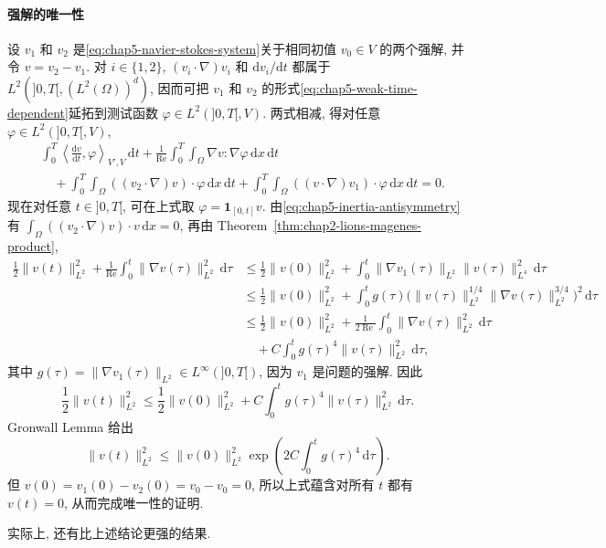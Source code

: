 \paragraph{强解的唯一性}
\label{subsec:chap5-strong-uniqueness}

设 $v_1$ 和 $v_2$ 是\eqref{eq:chap5-navier-stokes-system}关于相同初值 $v_0\in V$ 的两个强解, 并令 $v=v_2-v_1$. 对 $i\in\{1,2\}$, $(v_i\cdot\nabla)v_i$ 和 $\mathrm dv_i/\mathrm dt$ 都属于 $L^2(]0,T[,(L^2(\Omega))^d)$, 因而可把 $v_1$ 和 $v_2$ 的形式\eqref{eq:chap5-weak-time-dependent}延拓到测试函数 $\varphi\in L^2(]0,T[,V)$. 两式相减, 得对任意 $\varphi\in L^2(]0,T[,V)$,
\begin{align*}
 &\int_0^T\left\langle\frac{\mathrm dv}{\mathrm dt},\varphi\right\rangle_{V',V}\,\mathrm dt
 +\frac1{\operatorname{Re}}\int_0^T\int_\Omega\nabla v:\nabla\varphi\,\mathrm dx\,\mathrm dt\\
 &\quad+\int_0^T\int_\Omega((v_2\cdot\nabla)v)\cdot\varphi\,\mathrm dx\,\mathrm dt
 +\int_0^T\int_\Omega((v\cdot\nabla)v_1)\cdot\varphi\,\mathrm dx\,\mathrm dt=0.
\end{align*}
现在对任意 $t\in]0,T[$, 可在上式取 $\varphi=\mathbf1_{[0,t]}v$. 由\eqref{eq:chap5-inertia-antisymmetry}有 $\int_\Omega((v_2\cdot\nabla)v)\cdot v\,\mathrm dx=0$, 再由 Theorem~\ref{thm:chap2-lions-magenes-product},
\begin{align*}
 \frac12\|v(t)\|_{L^2}^2
 +\frac1{\operatorname{Re}}\int_0^t\|\nabla v(\tau)\|_{L^2}^2\,\mathrm d\tau
 &\leq\frac12\|v(0)\|_{L^2}^2
 +\int_0^t\|\nabla v_1(\tau)\|_{L^2}\|v(\tau)\|_{L^4}^2\,\mathrm d\tau\\
 &\leq\frac12\|v(0)\|_{L^2}^2
 +\int_0^tg(\tau)\bigl(\|v(\tau)\|_{L^2}^{1/4}
 \|\nabla v(\tau)\|_{L^2}^{3/4}\bigr)^2\,\mathrm d\tau\\
 &\leq\frac12\|v(0)\|_{L^2}^2
 +\frac1{2\operatorname{Re}}\int_0^t\|\nabla v(\tau)\|_{L^2}^2\,\mathrm d\tau\\
 &\quad+C\int_0^tg(\tau)^4\|v(\tau)\|_{L^2}^2\,\mathrm d\tau,
\end{align*}
其中 $g(\tau)=\|\nabla v_1(\tau)\|_{L^2}\in L^\infty(]0,T[)$, 因为 $v_1$ 是问题的强解. 因此
\[
 \frac12\|v(t)\|_{L^2}^2
 \leq\frac12\|v(0)\|_{L^2}^2
 +C\int_0^tg(\tau)^4\|v(\tau)\|_{L^2}^2\,\mathrm d\tau.
\]
Gronwall Lemma 给出
\[
 \|v(t)\|_{L^2}^2
 \leq\|v(0)\|_{L^2}^2
 \exp\left(2C\int_0^tg(\tau)^4\,\mathrm d\tau\right).
\]
但 $v(0)=v_1(0)-v_2(0)=v_0-v_0=0$, 所以上式蕴含对所有 $t$ 都有 $v(t)=0$, 从而完成唯一性的证明.

实际上, 还有比上述结论更强的结果.

